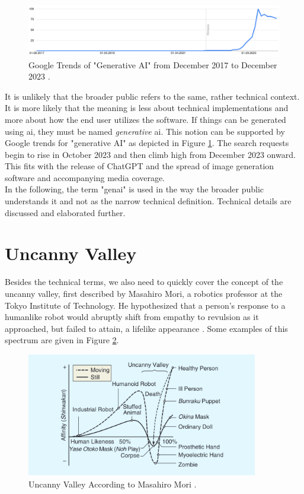 \documentclass[
  a4paper,  %
  twoside,  %
  bibliography=totoc,
  headsepline,
  cleardoublepage=empty,
  parskip=half,
  draft=false
]{scrbook}
\begin{document}
\begin{figure}[h]
  \centering
  \includegraphics[width=1\textwidth]{./graphics/gtrends_genAI_1712-2312.png}
  \caption{Google Trends of "Generative AI" from December 2017 to December 2023 \cite{googletrendsGoogleTrendsQuery}.}
  \label{fig:gtrend-genai}
\end{figure}

It is unlikely that the broader public refers to the same, rather technical context. It is more likely that the meaning is less about technical implementations and more about how the end user utilizes the software. If things can be generated using \gls{ai}, they must be named \textit{generative} \gls{ai}. This notion can be supported by Google trends for "generative AI" as depicted in Figure \ref{fig:gtrend-genai}. The search requests begin to rise in October 2023 and then climb high from December 2023 onward. This fits with the release of ChatGPT and the spread of image generation software and accompanying media coverage. \\
In the following, the term "\gls{genai}" is used in the way the broader public understands it and not as the narrow technical definition. Technical details are discussed and elaborated further. 

\section{Uncanny Valley}
Besides the technical terms, we also need to quickly cover the concept of the uncanny valley, first described by Masahiro Mori, a robotics professor at the Tokyo Institute of Technology. He hypothesized that a person's response to a humanlike robot would abruptly shift from empathy to revulsion as it approached, but failed to attain, a lifelike appearance \cite{moriUncannyValleyField2012}. Some examples of this spectrum are given in Figure \ref{fig:uncanny-valley}.

\begin{figure}[h]
  \centering
  \includegraphics[width=0.9\textwidth]{./graphics/uncanny-valley.png}
  \caption{Uncanny Valley According to Masahiro Mori \cite{moriUncannyValleyField2012}.}
  \label{fig:uncanny-valley}
\end{figure}
\end{document}
